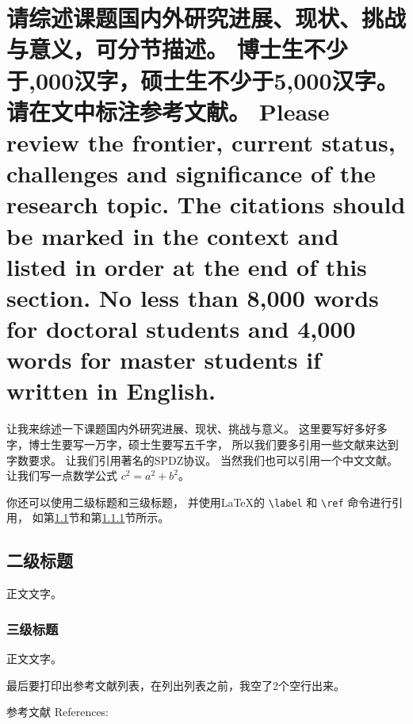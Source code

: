 \documentclass[a4paper,zihao=-4,AutoFakeBold]{ctexart}
\begin{document}


\section{请综述课题国内外研究进展、现状、挑战与意义，可分节描述。
    博士生不少于,000汉字，硕士生不少于5,000汉字。请在文中标注参考文献。 
    Please review the frontier, current status, 
    challenges and significance of the research topic. 
    The citations should be marked in the context 
    and listed in order at the end of this section. 
    No less than 8,000 words for doctoral students 
    and 4,000 words for master students if written in English.}


让我来综述一下课题国内外研究进展、现状、挑战与意义。
这里要写好多好多字，博士生要写一万字，硕士生要写五千字，
所以我们要多引用一些文献来达到字数要求。
让我们引用著名的SPDZ协议\cite{SPDZ}。
当然我们也可以引用一个中文文献\cite{ZJSD}。
让我们写一点数学公式 $c^2 = a^2 + b^2$。

你还可以使用二级标题和三级标题，
并使用\LaTeX 的 \verb|\label| 和 \verb|\ref| 命令进行引用，
如第\ref{sub}节和第\ref{subsub}节所示。


\subsection{二级标题}\label{sub}
正文文字。

\subsubsection{三级标题}\label{subsub}
正文文字。



最后要打印出参考文献列表，在列出列表之前，我空了2个空行出来。

\vspace{2\baselineskip}
{
    \linespread{1.25}\selectfont%
    参考文献 References: 
    \printbibliography[heading=none]
}
\end{document}
